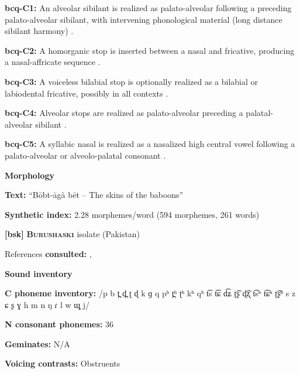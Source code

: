 \textbf{bcq-C1:} An alveolar sibilant is realized as palato-alveolar following a preceding palato-alveolar sibilant, with intervening phonological material (long distance sibilant harmony) \citep[67]{Rapold2006}.



\textbf{bcq-C2:} A homorganic stop is inserted between a nasal and fricative, producing a nasal-affricate sequence \citep[69]{Rapold2006}.



\textbf{bcq-C3:} A voiceless bilabial stop is optionally realized as a bilabial or labiodental fricative, possibly in all contexts \citep[73]{Rapold2006}.



\textbf{bcq-C4:} Alveolar stops are realized as palato-alveolar preceding a palatal-alveolar sibilant \citep[74]{Rapold2006}.



\textbf{bcq-C5:} A syllabic nasal is realized as a nasalized high central vowel following a palato-alveolar or alveolo-palatal consonant \citep[76]{Rapold2006}.



\textbf{Morphology}



\textbf{Text:} “Bōbt-āgà bēt -- The skins of the baboons” \citep[594-599]{Rapold2006}



\textbf{Synthetic index:} 2.28 morphemes/word (594 morphemes, 261 words)



\textbf{[bsk]}   \textbf{\textsc{Burushaski}}  isolate (Pakistan)



References \textbf{consulted:} \citet{Anderson1997}, \citet{Yoshioka2012}



\textbf{Sound inventory}



\textbf{C phoneme inventory:} /p b t̪ d̪ ʈ ɖ k ɡ q pʰ t̪ʰ ʈʰ kʰ qʰ t͡s t͡ɕ d͡ʑ ʈ͡ʂ ɖ͡ʐ t͡sʰ t͡ɕʰ ʈ͡ʂʰ s z ɕ ʂ ɣ h m n ŋ ɾ l w ɰ̟ j/



\textbf{N consonant phonemes:} 36



\textbf{Geminates:} N/A



\textbf{Voicing contrasts:} Obstruents



